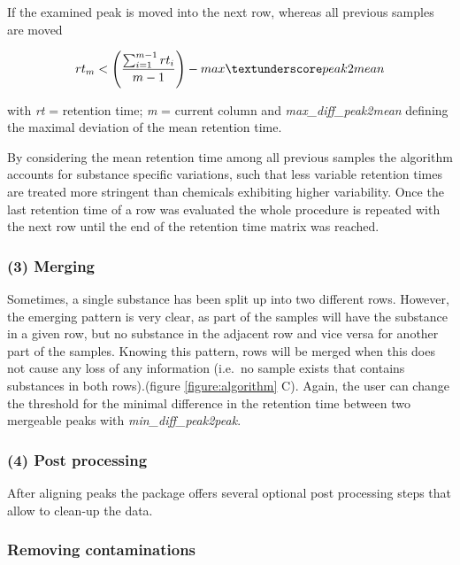 If the examined peak is moved into the next row, whereas all previous
samples are moved

\begin{equation}
rt_{m} < \left(\frac{\sum_{i=1}^{m-1}rt_{i}}{m-1}\right) - max\textunderscore peak2mean
\end{equation}

with \emph{rt} = retention time; \emph{m} = current column and
\emph{max\_diff\_peak2mean} defining the maximal deviation of the mean
retention time.

By considering the mean retention time among all previous samples the
algorithm accounts for substance specific variations, such that less
variable retention times are treated more stringent than chemicals
exhibiting higher variability. Once the last retention time of a row was
evaluated the whole procedure is repeated with the next row until the
end of the retention time matrix was reached.

\subsubsection{(3) Merging}\label{merging}

Sometimes, a single substance has been split up into two different rows.
However, the emerging pattern is very clear, as part of the samples will
have the substance in a given row, but no substance in the adjacent row
and vice versa for another part of the samples. Knowing this pattern,
rows will be merged when this does not cause any loss of any information
(i.e.~no sample exists that contains substances in both rows).(figure
\ref{figure:algorithm} C). Again, the user can change the threshold for
the minimal difference in the retention time between two mergeable peaks
with \emph{min\_diff\_peak2peak}. \par 

\subsubsection{(4) Post processing}\label{post-processing}

After aligning peaks the package offers several optional post processing
steps that allow to clean-up the data.

\subsubsection{Removing contaminations}\label{removing-contaminations}

